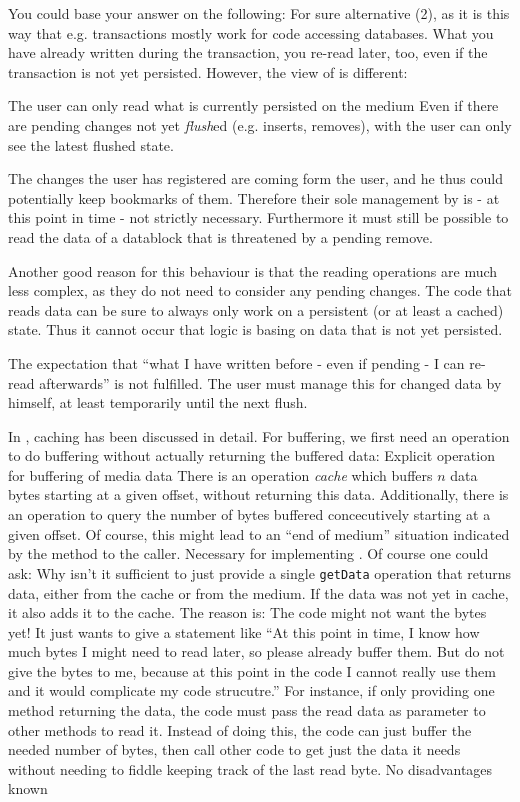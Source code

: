 You could base your answer on the following: For sure alternative (2), as it is this way that e.g. transactions mostly work for code accessing databases. What you have already written during the transaction, you re-read later, too, even if the transaction is not yet persisted. However, the view of \LibName{} is different:

{%
The user can only read what is currently persisted on the medium
}
{%
Even if there are pending changes not yet \emph{flush}ed (e.g. inserts, removes), with \COMPmedia{} the user can only see the latest flushed state.
}
{%
The changes the user has registered are coming form the user, and he thus could potentially keep bookmarks of them. Therefore their sole management by \COMPmedia{} is - at this point in time - not strictly necessary. Furthermore it must still be possible to read the data of a datablock that is threatened by a pending remove. 

Another good reason for this behaviour is that  the reading operations are much less complex, as they do not need to consider any pending changes. The code that reads data can be sure to always only work on a persistent (or at least a cached) state. Thus it cannot occur that logic is basing on data that is not yet persisted.
}
{%
The expectation that ``what I have written before - even if pending - I can re-read afterwards'' is not fulfilled. The user must manage this for changed data by himself, at least temporarily until the next flush. 
}

In , caching has been discussed in detail. For buffering, we first need an operation to do buffering without actually returning the buffered data:
{%
Explicit operation for buffering of media data
}
{%
There is an operation \emph{cache} which buffers $n$ data bytes starting at a given offset, without returning this data. Additionally, there is an operation to query the number of bytes buffered concecutively starting at a given offset. Of course, this might lead to an ``end of medium'' situation indicated by the method to the caller.
}
{%
Necessary for implementing . Of course one could ask: Why isn't it sufficient to just provide a single \texttt{getData} operation that returns data, either from the cache or from the medium. If the data was not yet in cache, it also adds it to the cache. The reason is: The code might not want the bytes yet! It just wants to give a statement like ``At this point in time, I know how much bytes I might need to read later, so please already buffer them. But do not give the bytes to me, because at this point in the code I cannot really use them and it would complicate my code strucutre.'' For instance, if only providing one method returning the data, the code must pass the read data as parameter to other methods to read it. Instead of doing this, the code can just buffer the needed number of bytes, then call other code to get just the data it needs without needing to fiddle keeping track of the last read byte.
}
{%
No disadvantages known
}

